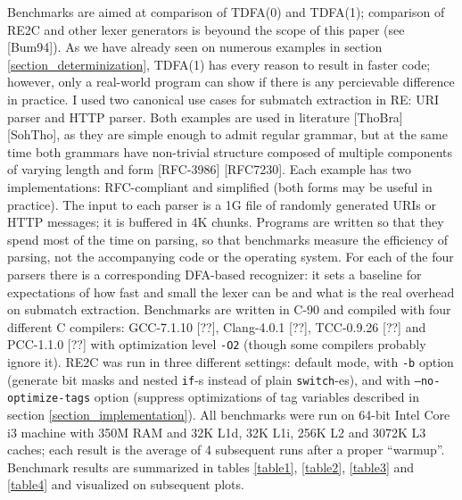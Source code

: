 \documentclass{article}
\theoremstyle{definition}
\begin{document}
\begin{multicols}{2}
Benchmarks are aimed at comparison of TDFA(0) and TDFA(1);
comparison of RE2C and other lexer generators is beyound the scope of this paper (see [Bum94]).
As we have already seen on numerous examples in section \ref{section_determinization},
TDFA(1) has every reason to result in faster code;
however, only a real-world program can show if there is any percievable difference in practice.
I used two canonical use cases for submatch extraction in RE: URI parser and HTTP parser.
Both examples are used in literature [ThoBra] [SohTho],
as they are simple enough to admit regular grammar,
but at the same time both grammars have non-trivial structure composed of multiple components of varying length and form [RFC-3986] [RFC7230].
Each example has two implementations: RFC-compliant and simplified (both forms may be useful in practice).
The input to each parser is a 1G file of randomly generated URIs or HTTP messages; it is buffered in 4K chunks.
Programs are written so that they spend most of the time on parsing,
so that benchmarks measure the efficiency of parsing, not the accompanying code or the operating system.
For each of the four parsers there is a corresponding DFA-based recognizer:
it sets a baseline for expectations of how fast and small the lexer can be and what is the real overhead on submatch extraction.
Benchmarks are written in C-90 and compiled with four different C compilers:
GCC-7.1.10 [??],
Clang-4.0.1 [??],
TCC-0.9.26 [??]
and PCC-1.1.0 [??]
with optimization level \texttt{-O2} (though some compilers probably ignore it).
RE2C was run in three different settings:
default mode, with \texttt{-b} option (generate bit masks and nested \texttt{if}-s instead of plain \texttt{switch}-es),
and with \texttt{--no-optimize-tags} option (suppress optimizations of tag variables described in section \ref{section_implementation}).
All benchmarks were run on 64-bit Intel Core i3 machine with 350M RAM and 32K L1d, 32K L1i, 256K L2 and 3072K L3 caches;
each result is the average of 4 subsequent runs after a proper ``warmup''.
Benchmark results are summarized in tables \ref{table1}, \ref{table2}, \ref{table3} and \ref{table4}
and visualized on subsequent plots.

\end{multicols}
\end{document}
